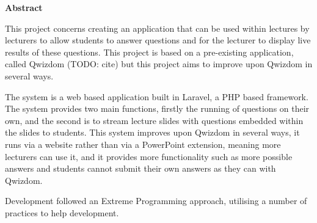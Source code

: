 \thispagestyle{empty}

\begin{center}
    {\LARGE\bf Abstract}
\end{center}

This project concerns creating an application that can be used within lectures by lecturers to allow students to answer questions and for the lecturer to display live results of these questions. This project is based on a pre-existing application, called Qwizdom (TODO: cite) but this project aims to improve upon Qwizdom in several ways.

The system is a web based application built in Laravel, a PHP based framework. The system provides two main functions, firstly the running of questions on their own, and the second is to stream lecture slides with questions embedded within the slides to students. This system improves upon Qwizdom in several ways, it runs via a website rather than via a PowerPoint extension, meaning more lecturers can use it, and it provides more functionality such as more possible answers and students cannot submit their own answers as they can with Qwizdom.

Development followed an Extreme Programming approach, utilising a number of practices to help development.